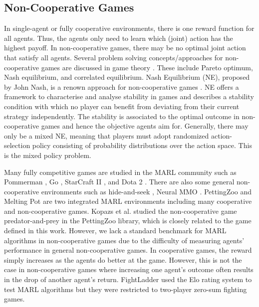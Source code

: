 \documentclass[]{interact}
\theoremstyle{plain}%
\theoremstyle{definition}
\theoremstyle{remark}
\begin{document}
\subsection{Non-Cooperative Games}
In single-agent or fully cooperative environments, there is one reward function for all agents. Thus, the agents only need to learn which (joint) action has the highest payoff. In non-cooperative games, there may be no optimal joint action that satisfy all agents. Several problem solving concepts/approaches for non-cooperative games are discussed in game theory \cite{albrecht2024multi}. These include Pareto optimum, Nash equilibrium, and correlated equilibrium. Nash Equilibrium (NE), proposed by John Nash, is a renown approach for non-cooperative games \cite{nash2024non}. NE offers a framework to characterise and analyse stability in games and describes a stability condition with which no player can benefit from deviating from their current strategy independently. The stability is associated to the optimal outcome in non-cooperative games and hence the objective agents aim for. Generally, there may only be a mixed NE, meaning that players must adopt randomized action-selection policy consisting of probability distributions over the action space. This is the mixed policy problem.

Many fully competitive games are studied in the MARL community such as Pommerman \cite{resnick2018pommerman}, Go \cite{silver2017mastering}, StarCraft II \cite{vinyals2019grandmaster}, and Dota 2 \cite{berner2019dota}. There are also some general non-cooperative environments such as hide-and-seek \cite{baker2019emergent}, Neural MMO \cite{suarez2021neural}. PettingZoo and Melting Pot \cite{terry2021pettingzoo, leibo2021scalable} are two integrated MARL environments including many cooperative and non-cooperative games. Kopazs et al. \cite{kopacz2023evaluating} studied the non-cooperative game predator-and-prey in the PettingZoo library, which is closely related to the game defined in this work. However, we lack a standard benchmark for MARL algorithms in non-cooperative games due to the difficulty of measuring agents' performance in general non-cooperative games. In cooperative games, the reward simply increases as the agents do better at the game. However, this is not the case in non-cooperative games where increasing one agent's outcome often results in the drop of another agent's return. FightLadder \cite{li2024fightladder} used the Elo rating system to test MARL algorithms but they were restricted to two-player zero-sum fighting games.
\end{document}

